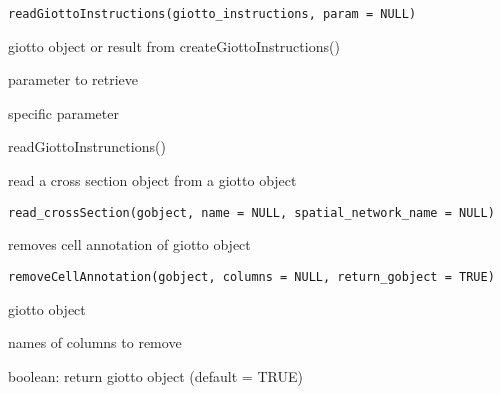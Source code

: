 \documentclass[a4paper]{book}
\begin{document}
%
\begin{Usage}
\begin{verbatim}
readGiottoInstructions(giotto_instructions, param = NULL)
\end{verbatim}
\end{Usage}
%
\begin{Arguments}
\begin{ldescription}
\item[\code{giotto\_instructions}] giotto object or result from createGiottoInstructions()

\item[\code{param}] parameter to retrieve
\end{ldescription}
\end{Arguments}
%
\begin{Value}
specific parameter
\end{Value}
%
\begin{Examples}
\begin{ExampleCode}
    readGiottoInstrunctions()
\end{ExampleCode}
\end{Examples}
%
\begin{Description}\relax
read a cross section object from a giotto object
\end{Description}
%
\begin{Usage}
\begin{verbatim}
read_crossSection(gobject, name = NULL, spatial_network_name = NULL)
\end{verbatim}
\end{Usage}
%
\begin{Description}\relax
removes cell annotation of giotto object
\end{Description}
%
\begin{Usage}
\begin{verbatim}
removeCellAnnotation(gobject, columns = NULL, return_gobject = TRUE)
\end{verbatim}
\end{Usage}
%
\begin{Arguments}
\begin{ldescription}
\item[\code{gobject}] giotto object

\item[\code{columns}] names of columns to remove

\item[\code{return\_gobject}] boolean: return giotto object (default = TRUE)
\end{ldescription}
\end{Arguments}
\end{document}
